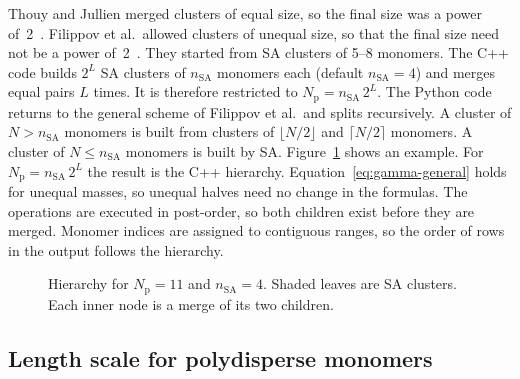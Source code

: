 \documentclass[11pt,a4paper]{article}
\newcommand{\nSA}{n_\text{SA}}
\begin{document}
Thouy and Jullien merged clusters of equal size, so the final size was a power of~2~\cite{thouy1994}.
Filippov et al.\ allowed clusters of unequal size, so that the final size need not be a power of~2~\cite{filippov2000}.
They started from SA clusters of 5--8 monomers.
The C++ code builds $2^L$ SA clusters of $\nSA$ monomers each (default $\nSA = 4$) and merges equal pairs $L$ times.
It is therefore restricted to $N_\text{p} = \nSA\,2^L$.
The Python code returns to the general scheme of Filippov et al.\ and splits recursively.
A cluster of $N > \nSA$ monomers is built from clusters of $\lfloor N/2 \rfloor$ and $\lceil N/2 \rceil$ monomers.
A cluster of $N \le \nSA$ monomers is built by SA.
Figure~\ref{fig:hierarchy} shows an example.
For $N_\text{p} = \nSA\,2^L$ the result is the C++ hierarchy.
Equation~\eqref{eq:gamma-general} holds for unequal masses, so unequal halves need no change in the formulas.
The operations are executed in post-order, so both children exist before they are merged.
Monomer indices are assigned to contiguous ranges, so the order of rows in the output follows the hierarchy.

\begin{figure}[htbp]
  \centering
  \caption{Hierarchy for $N_\text{p} = 11$ and $\nSA = 4$.
  Shaded leaves are SA clusters.
  Each inner node is a merge of its two children.}
  \label{fig:hierarchy}
\end{figure}

\subsection{Length scale for polydisperse monomers}
\label{sec:polydisperse}
\end{document}
